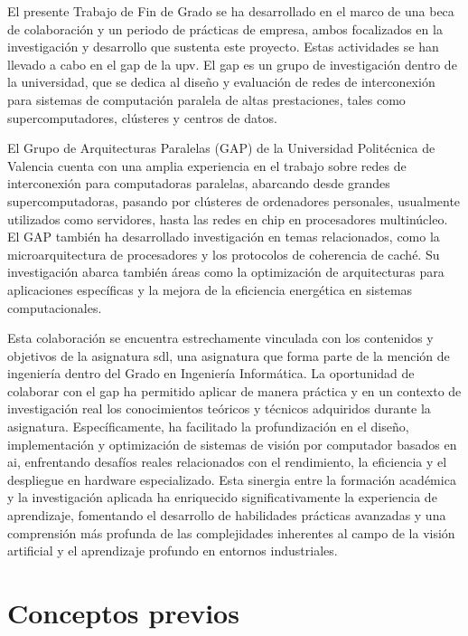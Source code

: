 \documentclass[11pt,spanish,listoffigures,listoftables]{tfgetsinf}
\begin{document}
El presente Trabajo de Fin de Grado se ha desarrollado en el marco de una beca de colaboración y un periodo de prácticas de empresa, ambos focalizados en la investigación y desarrollo que sustenta este proyecto. Estas actividades se han llevado a cabo en el \gls{gap} de la \gls{upv}. El \gls{gap} es un grupo de investigación dentro de la universidad, que se dedica al diseño y evaluación de redes de interconexión para sistemas de computación paralela de altas prestaciones, tales como supercomputadores, clústeres y centros de datos.

El Grupo de Arquitecturas Paralelas (GAP) de la Universidad Politécnica de Valencia cuenta con una amplia experiencia en el trabajo sobre redes de interconexión para computadoras paralelas, abarcando desde grandes supercomputadoras, pasando por clústeres de ordenadores personales, usualmente utilizados como servidores, hasta las redes en chip en procesadores multinúcleo. El GAP también ha desarrollado investigación en temas relacionados, como la microarquitectura de procesadores y los protocolos de coherencia de caché. Su investigación abarca también áreas como la optimización de arquitecturas para aplicaciones específicas y la mejora de la eficiencia energética en sistemas computacionales.

Esta colaboración se encuentra estrechamente vinculada con los contenidos y objetivos de la asignatura \gls{sdl}, una asignatura que forma parte de la mención de ingeniería dentro del Grado en Ingeniería Informática. La oportunidad de colaborar con el \gls{gap} ha permitido aplicar de manera práctica y en un contexto de investigación real los conocimientos teóricos y técnicos adquiridos durante la asignatura. Específicamente, ha facilitado la profundización en el diseño, implementación y optimización de sistemas de visión por computador basados en \gls{ai}, enfrentando desafíos reales relacionados con el rendimiento, la eficiencia y el despliegue en hardware especializado. Esta sinergia entre la formación académica y la investigación aplicada ha enriquecido significativamente la experiencia de aprendizaje, fomentando el desarrollo de habilidades prácticas avanzadas y una comprensión más profunda de las complejidades inherentes al campo de la visión artificial y el aprendizaje profundo en entornos industriales.


\chapter{Conceptos previos}\label{chap:conceptos_previos}
\end{document}

